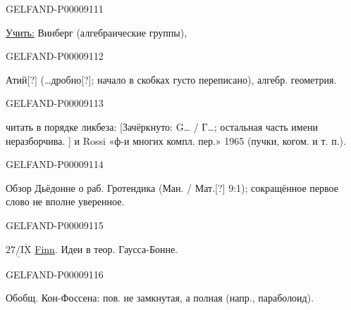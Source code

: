 \begin{GelfandAdjacentEvidence}{GELFAND-P000091}{11}

\underline{Учить:} Винберг (алгебраические группы),
\end{GelfandAdjacentEvidence}
\begin{GelfandAdjacentEvidence}{GELFAND-P000091}{12}

Атий[?] (…дробно[?]; начало в скобках густо переписано), алгебр. геометрия.

\end{GelfandAdjacentEvidence}
\begin{GelfandAdjacentEvidence}{GELFAND-P000091}{13}

читать в порядке ликбеза:
[Зачёркнуто:
G… / Г…; остальная часть имени неразборчива.
] и Rossi «ф-и многих компл. пер.» 1965
(пучки, когом. и т. п.).
\end{GelfandAdjacentEvidence}
\begin{GelfandAdjacentEvidence}{GELFAND-P000091}{14}

Обзор Дьёдонне о раб. Гротендика
(Ман. / Мат.[?] 9:1); сокращённое первое слово не вполне уверенное.

\end{GelfandAdjacentEvidence}
\begin{GelfandAdjacentEvidence}{GELFAND-P000091}{15}


$\underline{27/\overline{\underline{\mathrm{IX}}}}$ \underline{Finn}. Идеи в теор. Гаусса-Бонне.
\end{GelfandAdjacentEvidence}
\begin{GelfandAdjacentEvidence}{GELFAND-P000091}{16}

Обобщ. Кон-Фоссена: пов. не замкнутая, а полная (напр., параболоид).
\end{GelfandAdjacentEvidence}
